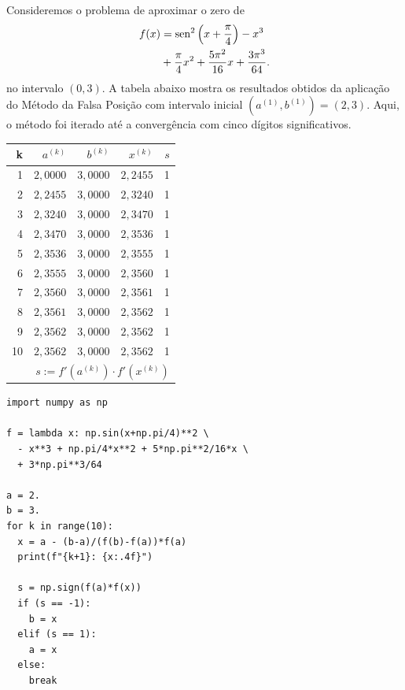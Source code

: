\begin{ex}
  Consideremos o problema de aproximar o zero de
  \begin{equation}
    \begin{aligned}
      f(x) &= \operatorname{sen}^2\left(x+\frac{\pi}{4}\right) - x^3 \\
           &+ \frac{\pi}{4}x^2 + \frac{5\pi^2}{16}x + \frac{3\pi^3}{64}.
    \end{aligned}
\end{equation}
no intervalo $(0, 3)$. A tabela abaixo mostra os resultados obtidos da aplicação do Método da Falsa Posição com intervalo inicial $(a^{(1)}, b^{(1)}) = (2, 3)$. Aqui, o método foi iterado até a convergência com cinco dígitos significativos.

\begin{center}
  \begin{tabular}{r|rr|r|r}
    k & $a^{(k)}$ & $b^{(k)}$ & $x^{(k)}$ & $s$\\\hline
    1 & $2,0000$ & $3,0000$ & $2,2455$ & 1 \\
    2 & $2,2455$ & $3,0000$ & $2,3240$ &  1 \\
    3 & $2,3240$ & $3,0000$ & $2,3470$ & 1 \\
    4 & $2,3470$ & $3,0000$ & $2,3536$ & 1 \\
    5 & $2,3536$ & $3,0000$ & $2,3555$ & 1 \\
    6 & $2,3555$ & $3,0000$ & $2,3560$ & 1 \\
    7 & $2,3560$ & $3,0000$ & $2,3561$ &  1 \\
    8 & $2,3561$ & $3,0000$ & $2,3562$ & 1 \\
    9 & $2,3562$ & $3,0000$ & $2,3562$ & 1 \\
    10 & $2,3562$ & $3,0000$ & $2,3562$ & 1 \\\hline
    \multicolumn{5}{r}{\small $s := f'(a^{(k)})\cdot f'(x^{(k)})$}
  \end{tabular}
\end{center}

\begin{lstlisting}
import numpy as np

f = lambda x: np.sin(x+np.pi/4)**2 \
  - x**3 + np.pi/4*x**2 + 5*np.pi**2/16*x \
  + 3*np.pi**3/64

a = 2.
b = 3.
for k in range(10):
  x = a - (b-a)/(f(b)-f(a))*f(a)
  print(f"{k+1}: {x:.4f}")

  s = np.sign(f(a)*f(x))
  if (s == -1):
    b = x
  elif (s == 1):
    a = x
  else:
    break
\end{lstlisting}
\end{ex}

